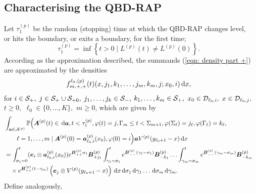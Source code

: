 \subsection{Characterising the QBD-RAP} 
Let \(\tau_1^{(p)}\) be the random (stopping) time at which the QBD-RAP changes level, or hits the boundary, or exits a boundary, for the first time;
\[\tau_1^{(p)} = \inf\left\{t>0\mid L^{(p)}(t)\neq L^{(p)}(0)\right\}.\]
According as the approximation described, the summands (\ref{eqn: density part +}) are approximated by the densities \[f^{\ell_0,(p)}_{m,+,+}(t)( x, j_1,k_1,\dots,j_m,k_m, j; x_0,i)\, \mathrm{d} x,\] 
for \(i\in\mathcal{S}_+,\) \(j\in\mathcal{S}_+\cup\mathcal{S}_{+0},\) \( j_1,\dots,j_k\in\mathcal{S}_-,\) \(k_1,\dots,k_m\in\mathcal{S}_+,\) \(x_0\in\mathcal{D}_{\ell_0,i},\) \(x\in\mathcal{D}_{\ell_0,j},\) \(t\geq0,\) \(\ell_0\in\{0,\dots,K\},\) \(m\geq 0\), which are given by
\begin{align}
	&\int_{\boldsymbol a \in\mathcal A^{(p)}}\mathbb P\Big(\boldsymbol A^{(p)}(t)\in \, \mathrm{d} \boldsymbol a, t<\tau_1^{(p)}, \varphi(t) = j, \Gamma_m\leq t<\Sigma_{m+1}, \nonumber
	\varphi(\Sigma_\ell) = j_\ell , \varphi(\Gamma_\ell) = k_\ell, 
	\\&\qquad \ell = 1,\dots,m \mid 
	\boldsymbol A^{(p)}(0) = \boldsymbol   a_{\ell_0,i}^{(p)}(x_0), \varphi(0) = i\Big)\boldsymbol aV^{(p)}(y_{\ell_0+1}-x)\, \mathrm{d} x\nonumber
	\\
	&=\int_{\sigma_1=0}^t (\boldsymbol e_i\otimes \boldsymbol  a_{\ell_0,i}^{(p)}(x_0)) e^{\boldsymbol{B}^{(p)}_{++}\sigma_1}\boldsymbol{B}^{(p)}_{+{j_1}}	\nonumber
	\int_{\gamma_1=\sigma_1}^{t} e^{\boldsymbol{B}^{(p)}_{--}(\gamma_1-\sigma_1)}\boldsymbol{B}^{(p)}_{-{k_1}}
	\hdots 
	 \int_{\gamma_m=\sigma_{m}}^{t} e^{\boldsymbol{B}^{(p)}_{--}(\gamma_m-\sigma_{m})}\boldsymbol{B}^{(p)}_{-{k_m}}\\&\quad\times
	e^{\boldsymbol{B}^{(p)}_{++}(t-\gamma_m)}\left(\boldsymbol e_j  \otimes V^{(p)}(y_{\ell_0+1}-x)\right)\, \mathrm{d} x
	\, \mathrm{d} \sigma_1\, \mathrm{d} \gamma_1\dots \, \mathrm{d} \sigma_m\, \mathrm{d} \gamma_m. \label{eqn: approx end conv}
\end{align}
Define analogously, 
